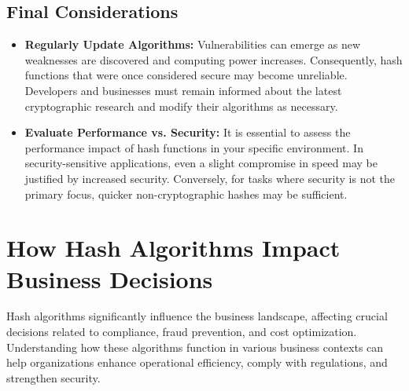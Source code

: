 \documentclass[11pt,a4paper]{article}
\begin{document}
    \subsection*{Final Considerations}
        \begin{itemize}
            \item \textbf{Regularly Update Algorithms:} Vulnerabilities can emerge as new weaknesses are discovered and computing power increases. Consequently, hash functions that were once considered secure may become unreliable. Developers and businesses must remain informed about the latest cryptographic research and modify their algorithms as necessary.

            \item \textbf{Evaluate Performance vs. Security:} It is essential to assess the performance impact of hash functions in your specific environment. In security-sensitive applications, even a slight compromise in speed may be justified by increased security. Conversely, for tasks where security is not the primary focus, quicker non-cryptographic hashes may be sufficient.

        \end{itemize}


\section*{How Hash Algorithms Impact Business Decisions}
Hash algorithms significantly influence the business landscape, affecting crucial decisions related to compliance, fraud prevention, and cost optimization. Understanding how these algorithms function in various business contexts can help organizations enhance operational efficiency, comply with regulations, and strengthen security.
\end{document}
